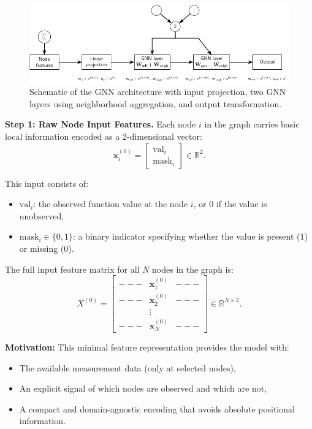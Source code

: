 \begin{figure}[ht]
    \centering
    \includegraphics[width=\textwidth]{images/graph_structure.pdf}
    \caption{Schematic of the GNN architecture with input projection, two GNN layers using neighborhood aggregation, and output transformation.}
    \label{fig:gnn-structure}
\end{figure}

%
{\bf Step 1: Raw Node Input Features.} Each node $i$ in the graph carries basic local information encoded as a 2-dimensional vector:
\[
\mathbf{x}_i^{(0)} =
\begin{bmatrix}
\mathrm{val}_i \\
\mathrm{mask}_i
\end{bmatrix} \in \mathbb{R}^2.
\]

This input consists of:
\begin{itemize}
  \item $\mathrm{val}_i$: the observed function value at the node $i$, or $0$ if the value is unobserved,
  \item $\mathrm{mask}_i \in \{0, 1\}$: a binary indicator specifying whether the value is present ($1$) or missing ($0$).
\end{itemize}

The full input feature matrix for all $N$ nodes in the graph is:
\[
X^{(0)} =
\begin{bmatrix}
--- & \mathbf{x}_1^{(0)} & --- \\
--- & \mathbf{x}_2^{(0)} & --- \\
& \vdots & \\
--- & \mathbf{x}_N^{(0)} & ---
\end{bmatrix}
\in \mathbb{R}^{N \times 2}.
\]

\medskip
{\bf Motivation:} This minimal feature representation provides the model with:
\begin{itemize}
  \item The available measurement data (only at selected nodes),
  \item An explicit signal of which nodes are observed and which are not,
  \item A compact and domain-agnostic encoding that avoids absolute positional information.
\end{itemize}

